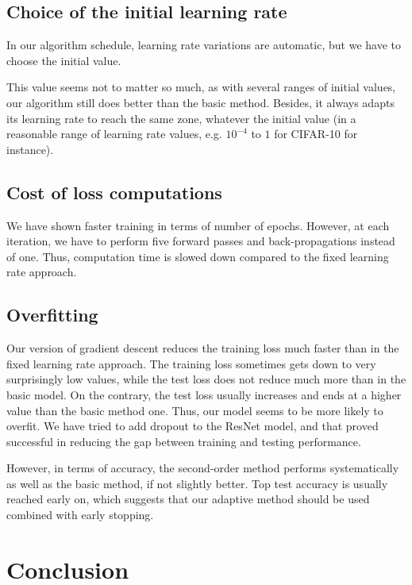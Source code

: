 \documentclass{article}
\begin{document}
  \subsection{Choice of the initial learning rate}
  
  In our algorithm schedule, learning rate variations are automatic, but we have to choose the initial value. 
  
  This value seems not to matter so much, as with several ranges of initial values, our algorithm still does better than the basic method. Besides, it always adapts its learning rate to reach the same zone, whatever the initial value (in a reasonable range of learning rate values, e.g. $10^{-4}$ to $1$ for CIFAR-10 for instance).
  
  \subsection{Cost of loss computations}
  
  We have shown faster training in terms of number of epochs. However, at each iteration, we have to perform five forward passes and back-propagations instead of one. Thus, computation time is slowed down compared to the fixed learning rate approach. 
  
  \subsection{Overfitting}
  
  Our version of gradient descent reduces the training loss much faster than in the fixed learning rate approach. The training loss sometimes gets down to very surprisingly low values, while the test loss does not reduce much more than in the basic model. On the contrary, the test loss usually increases and ends at a higher value than the basic method one. Thus, our model seems to be more likely to overfit. We have tried to add dropout to the ResNet model, and that proved successful in reducing the gap between training and testing performance.
  
  However, in terms of accuracy, the second-order method performs systematically as well as the basic method, if not slightly better. Top test accuracy is usually reached early on, which suggests that our adaptive method should be used combined with early stopping.
  
  \section{Conclusion}
  
\end{document}
